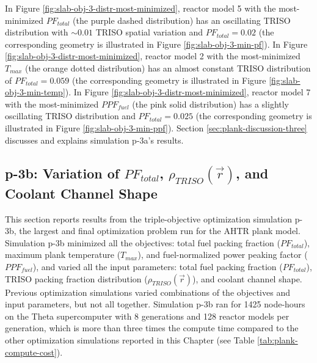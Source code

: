 In Figure \ref{fig:slab-obj-3-distr-most-minimized}, reactor model 5 with the
most-minimized $PF_{total}$ (the purple dashed distribution) has an oscillating TRISO 
distribution with ${\sim}0.01$ TRISO spatial variation and $PF_{total} = 0.02$ 
(the corresponding geometry is illustrated in Figure \ref{fig:slab-obj-3-min-pf}).
In Figure \ref{fig:slab-obj-3-distr-most-minimized}, reactor model 2 with the 
most-minimized $T_{max}$ (the orange dotted distribution) has an almost constant TRISO 
distribution of $PF_{total}=0.059$ (the corresponding geometry is illustrated in Figure 
\ref{fig:slab-obj-3-min-temp}). 
In Figure \ref{fig:slab-obj-3-distr-most-minimized}, reactor model 7 with the
most-minimized $PPF_{fuel}$ (the pink solid distribution) has a 
slightly oscillating TRISO distribution and $PF_{total} = 0.025$ 
(the corresponding geometry is illustrated in Figure \ref{fig:slab-obj-3-min-ppf}).
Section \ref{sec:plank-discussion-three} discusses and explains simulation p-3a's results.

\subsection{p-3b: Variation of $PF_{total}$, $\rho_{TRISO}(\vec{r})$, and Coolant 
Channel Shape}
\label{sec:p-3b}
This section reports results from the triple-objective optimization simulation p-3b, 
the largest and final optimization problem run for the \gls{AHTR} plank model. 
Simulation p-3b minimized all the objectives: total fuel packing fraction 
($PF_{total}$), maximum plank temperature ($T_{max}$), and fuel-normalized power 
peaking factor ($PPF_{fuel}$), and varied all the input parameters: total fuel packing 
fraction ($PF_{total}$), TRISO packing fraction distribution ($\rho_{TRISO}(\vec{r})$), 
and coolant channel shape.  
Previous optimization simulations varied combinations of the objectives and input 
parameters, but not all together. 
Simulation p-3b ran for 1425 node-hours on the Theta supercomputer 
with 8 generations and 128 reactor models per generation, which is more than three 
times the compute time compared to the other optimization simulations reported 
in this Chapter (see Table \ref{tab:plank-compute-cost}). 

